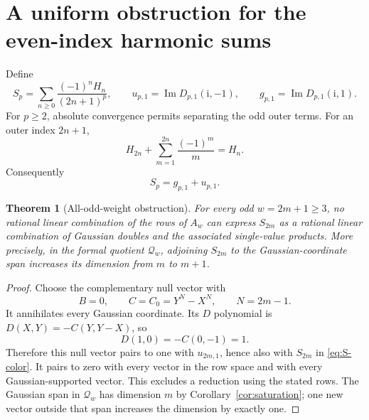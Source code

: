\documentclass[11pt,a4paper]{article}
\numberwithin{equation}{section}
\newtheorem{theorem}{Theorem}[section]
\theoremstyle{definition}\newtheorem{definition}[theorem]{Definition}
\theoremstyle{remark}\newtheorem{remark}[theorem]{Remark}
\newcommand{\ii}{\mathrm i}
\newcommand{\Imag}{\operatorname{Im}}
\begin{document}
\section{A uniform obstruction for the even-index harmonic sums}
\label{sec:obstruction}
Define
\[
S_p=\sum_{n\ge0}\frac{(-1)^nH_n}{(2n+1)^p},\qquad
u_{p,1}=\Imag D_{p,1}(\ii,-1),\qquad
g_{p,1}=\Imag D_{p,1}(\ii,1).
\]
For $p\ge2$, absolute convergence permits separating the odd outer terms.
For an outer index $2n+1$,
\[
H_{2n}+\sum_{m=1}^{2n}\frac{(-1)^m}{m}=H_n.
\]
Consequently
\begin{equation}
S_p=g_{p,1}+u_{p,1}.
\label{eq:S-color}
\end{equation}

\begin{theorem}[All-odd-weight obstruction]\label{thm:S-obstruction}
For every odd $w=2m+1\ge3$, no rational linear combination of the rows of
$A_w$ can express $S_{2m}$ as a rational linear combination of Gaussian
doubles and the associated single-value products. More precisely, in the
formal quotient $\mathcal Q_w$, adjoining $S_{2m}$ to the Gaussian-coordinate
span increases its dimension from $m$ to $m+1$.
\end{theorem}
\begin{proof}
Choose the complementary null vector with
\[
B=0,\qquad C=C_0=Y^N-X^N,\qquad N=2m-1.
\]
It annihilates every Gaussian coordinate. Its $D$ polynomial is
$D(X,Y)=-C(Y,Y-X)$, so
\[
D(1,0)=-C(0,-1)=1.
\]
Therefore this null vector pairs to one with $u_{2m,1}$, hence also with
$S_{2m}$ in \eqref{eq:S-color}. It pairs to zero with every vector in the
row space and with every Gaussian-supported vector. This excludes a
reduction using the stated rows. The Gaussian span in $\mathcal Q_w$ has
dimension $m$ by Corollary~\ref{cor:saturation}; one new vector outside that
span increases the dimension by exactly one.
\end{proof}
\end{document}
